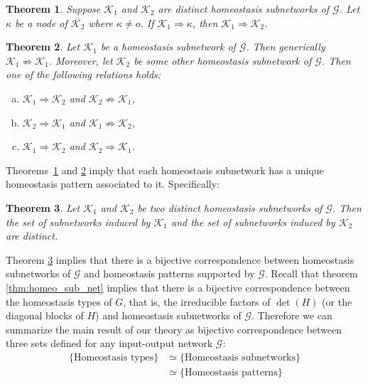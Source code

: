 \documentclass[a4paper,fleqn]{cas-dc}
\newtheorem{theorem}{Theorem}[section]
\begin{document}
\begin{theorem} \label{thm:pattern_from_subnetworks_intro}
Suppose $\mathcal{K}_1$ and $\mathcal{K}_2$ are distinct homeostasis subnetworks of $\mathcal{G}$.  Let $\kappa$ be a node of 
$\mathcal{K}_2$ where $\kappa\neq o$.  If $\mathcal{K}_1\Rightarrow \kappa$, then $\mathcal{K}_1 \Rightarrow \mathcal{K}_2$.
\end{theorem}


\begin{theorem} \label{thm:always_related_intro}
Let $\mathcal{K}_1$ be a homeostasis subnetwork of $\mathcal{G}$. Then generically $\mathcal{K}_1 \not\Rightarrow \mathcal{K}_1$.
Moreover, let $\mathcal{K}_2$ be some other homeostasis subnetwork of $\mathcal{G}$.
Then one of the following relations holds:
\begin{enumerate}[(a)]
\item $\mathcal{K}_1 \Rightarrow \mathcal{K}_2$ and $\mathcal{K}_2 \not\Rightarrow \mathcal{K}_1$,

\item $\mathcal{K}_2 \Rightarrow \mathcal{K}_1$ and $\mathcal{K}_1 \not\Rightarrow \mathcal{K}_2$,

\item $\mathcal{K}_1 \Rightarrow \mathcal{K}_2$ and $\mathcal{K}_2 \Rightarrow \mathcal{K}_1$.
\end{enumerate}
\end{theorem}

Theorems~\ref{thm:pattern_from_subnetworks_intro} and \ref{thm:always_related_intro} imply
that each homeostasis subnetwork has a unique homeostasis pattern associated to it.  Specifically:

\begin{theorem} \label{thm:bijective_corresp_intro}
Let $\mathcal{K}_1$ and $\mathcal{K}_2$ be two distinct homeostasis subnetworks of $\mathcal{G}$. 
Then the set of subnetworks induced by $\mathcal{K}_1$ and the set of subnetworks induced by $\mathcal{K}_2$ are distinct.
\end{theorem}

Theorem \ref{thm:bijective_corresp_intro} implies that there is a bijective correspondence between  homeostasis subnetworks of $\mathcal{G}$ and homeostasis patterns supported by $\mathcal{G}$.
Recall that theorem \ref{thm:homeo_sub_net} implies that there is a bijective correspondence between the homeostasis types of $G$, that is, the
irreducible factors of $\det(H)$ (or the diagonal blocks of $H$) and homeostasis subnetworks of $\mathcal{G}$.
Therefore we can summarize the main result of our theory as bijective correspondence between three sets defined for any input-output network $\mathcal{G}$:
\[
\begin{split}
\{\text{Homeostasis types}\} 
& \simeq \{\text{Homeostasis subnetworks}\} \\
& \simeq \{\text{Homeostasis patterns}\}
\end{split}
\]
\end{document}
